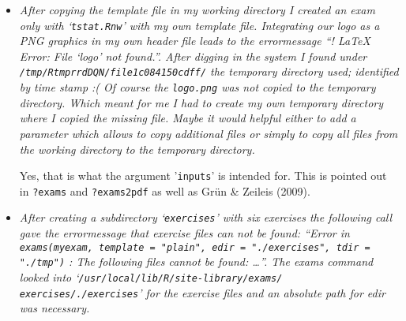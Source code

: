 \documentclass[a4paper]{article}
\begin{document}
\begin{itemize}
Second, we really liked the idea of the \texttt{exams.skeleton()} function that was
now added to the package. You can simply say
\begin{verbatim}
  exams.skeleton(dir = "/path/to/my/dir")
\end{verbatim}
and this will copy all exercise .Rnw files, the corresponding templates (for
{\LaTeX}, HTML, XML) and a `\texttt{demo.R}' script to the directory indicated. The `\texttt{demo.R}'
script then shows how different types of output can be generated by using
the files provided. The \texttt{exams.skeleton()} function also allows to restrict
the `\texttt{demo.R}' script to certain types of exercises (only num or mchoice etc.)
or certain \texttt{exams2}\emph{xyz}\texttt{()} interfaces, and to use absolute paths if desired. As
mentioned above, an encoding can also be specified and then the templates
will be modified accordingly (which has been tested for UTF-8, ISO-8859-1,
and ISO-8859-15).

Third, the manuscript now recommends explicitly not to start with customization
of a specific layout in {\LaTeX} but to rather start by creating some (simple)
.Rnw exercises and rendering them into different output formats. Adaptation
of existing .Rnw exercises should hopefully be easier after creating local
copies in a directory via \texttt{exams.skeleton()}.

\item {\it
After copying the template file in my working directory I created an exam
only with `\texttt{tstat.Rnw}' with my own template file.  Integrating our logo as
a PNG graphics in my own header file leads to the errormessage ``!  LaTeX
Error: File `logo' not found.''.  After digging in the system I found under
\texttt{/tmp/RtmprrdDQN/file1c084150cdff/} the temporary directory used; identified
by time stamp :( Of course the \texttt{logo.png} was not copied to the temporary
directory.  Which meant for me I had to create my own temporary directory
where I copied the missing file.  Maybe it would helpful either to add a
parameter which allows to copy additional files or simply to copy all
files from the working directory to the temporary directory.}

Yes, that is what the argument '\texttt{inputs}' is intended for. This is pointed out
in \texttt{?exams} and \texttt{?exams2pdf} as well as Gr\"un \& Zeileis (2009).

\item {\it
After creating a subdirectory `\texttt{exercises}' with six exercises the following
call gave the errormessage that exercise files can not be found: ``Error in
\texttt{exams(myexam, template = "plain", edir = "./exercises", tdir = "./tmp")} :
The following files cannot be found: \dots''.  The exams command looked into
`\texttt{/usr/local/lib/R/site-library/exams/} \texttt{exercises/./exercises}' for the
exercise files and an absolute path for edir was necessary.}


\end{itemize}
\end{document}
